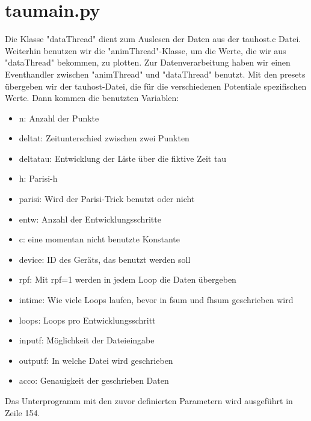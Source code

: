 \documentclass[a4paper,parskip=half,10pt]{scrartcl}
\begin{document}
\section{taumain.py}
Die Klasse "dataThread" dient zum Auslesen der Daten aus der tauhost.c Datei. Weiterhin benutzen wir die "animThread"-Klasse, um die Werte, die wir aus "dataThread" bekommen, zu plotten. Zur Datenverarbeitung haben wir einen Eventhandler zwischen "animThread" und "dataThread" benutzt.
Mit den presets übergeben wir der tauhost-Datei, die für die verschiedenen Potentiale spezifischen Werte.
Dann kommen die benutzten Variablen:
\begin{itemize}
\item n: Anzahl der Punkte
\item deltat: Zeitunterschied zwischen zwei Punkten
\item deltatau: Entwicklung der Liste über die fiktive Zeit tau
\item h: Parisi-h
\item parisi: Wird der Parisi-Trick benutzt oder nicht
\item entw: Anzahl der Entwicklungsschritte
\item c: eine momentan nicht benutzte Konstante
\item device: ID des Geräts, das benutzt werden soll
\item rpf: Mit rpf=1 werden in jedem Loop die Daten übergeben
\item intime: Wie viele Loops laufen, bevor in fsum und fhsum geschrieben wird
\item loops: Loops pro Entwicklungsschritt
\item inputf: Möglichkeit der Dateieingabe
\item outputf: In welche Datei wird geschrieben
\item acco: Genauigkeit der geschrieben Daten
\end{itemize}
Das Unterprogramm mit den zuvor definierten Parametern wird ausgeführt in Zeile 154.
\end{document}
